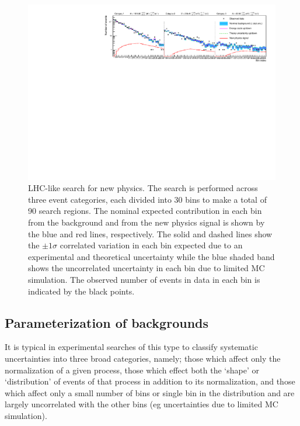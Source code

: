 \documentclass[11pt]{article}
\begin{document}
\begin{figure}
\begin{center}
\includegraphics[width=\textwidth]{figures/t}
\end{center}
\caption{LHC-like search for new physics. The search is performed across three event categories, each divided into 30 bins to make a total of 90 search regions. The nominal expected contribution in each bin from the
background and from the new physics signal is shown by the blue and red lines, respectively. The solid and dashed lines show the $\pm1\sigma$ correlated variation in each bin expected due to an experimental and theoretical
uncertainty while the blue shaded band shows the uncorrelated uncertainty in each bin due to limited MC simulation. The observed number of events in data in each bin is indicated by the black points.}
\label{fig:toy}
\end{figure}

\clearpage

\subsection{Parameterization of backgrounds}

It is typical in experimental searches of this type to classify systematic uncertainties into three broad categories, namely; those which affect only the normalization of a given process, those which effect both the
`shape' or `distribution' of events of that process in addition to its normalization, and those which affect only a small number of bins or single bin in the distribution and are largely uncorrelated with the other
bins (eg uncertainties due to limited MC simulation).
\end{document}
